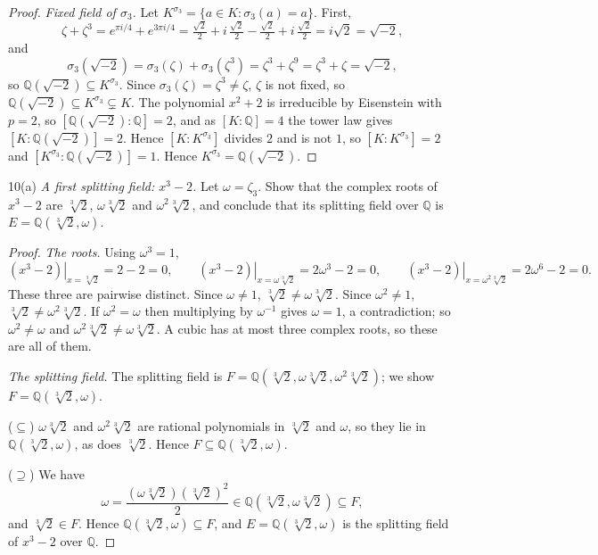 \documentclass[11pt]{article}
\begin{document}
\begin{proof}
\emph{Fixed field of $\sigma_3$.} Let
$K^{\sigma_3} = \{a \in K : \sigma_3(a) = a\}$. First,
\[
  \zeta + \zeta^3 = e^{\pi i/4} + e^{3\pi i/4}
  = \tfrac{\sqrt2}{2} + i\,\tfrac{\sqrt2}{2} - \tfrac{\sqrt2}{2} + i\,\tfrac{\sqrt2}{2}
  = i\sqrt2 = \sqrt{-2},
\]
and
\[
  \sigma_3(\sqrt{-2}) = \sigma_3(\zeta) + \sigma_3(\zeta^3)
  = \zeta^3 + \zeta^9 = \zeta^3 + \zeta = \sqrt{-2},
\]
so $\mathbb{Q}(\sqrt{-2}) \subseteq K^{\sigma_3}$. Since $\sigma_3(\zeta) = \zeta^3 \ne \zeta$,
$\zeta$ is not fixed, so
$\mathbb{Q}(\sqrt{-2}) \subseteq K^{\sigma_3} \subsetneq K$. The polynomial $x^2+2$ is
irreducible by Eisenstein with $p = 2$, so $[\mathbb{Q}(\sqrt{-2}):\mathbb{Q}] = 2$, and
as $[K:\mathbb{Q}] = 4$ the tower law gives $[K:\mathbb{Q}(\sqrt{-2})] = 2$. Hence
$[K:K^{\sigma_3}]$ divides $2$ and is not $1$, so $[K:K^{\sigma_3}] = 2$ and
$[K^{\sigma_3}:\mathbb{Q}(\sqrt{-2})] = 1$. Hence $K^{\sigma_3} = \mathbb{Q}(\sqrt{-2})$.
\end{proof}

\begin{problem}{10(a)}
  \emph{A first splitting field: $x^3 - 2$.} Let $\omega = \zeta_3$. Show that
  the complex roots of $x^3 - 2$ are $\sqrt[3]{2}$, $\omega\sqrt[3]{2}$ and
  $\omega^2\sqrt[3]{2}$, and conclude that its splitting field over
  $\mathbb{Q}$ is $E = \mathbb{Q}(\sqrt[3]{2}, \omega)$.
\end{problem}

\begin{proof}
\emph{The roots.} Using $\omega^3 = 1$,
\[
  \left.(x^3-2)\right|_{x=\sqrt[3]{2}} = 2 - 2 = 0, \qquad
  \left.(x^3-2)\right|_{x=\omega\sqrt[3]{2}} = 2\omega^3 - 2 = 0, \qquad
  \left.(x^3-2)\right|_{x=\omega^2\sqrt[3]{2}} = 2\omega^6 - 2 = 0.
\]
These three are pairwise distinct. Since $\omega \ne 1$,
$\sqrt[3]{2} \ne \omega\sqrt[3]{2}$. Since $\omega^2 \ne 1$,
$\sqrt[3]{2} \ne \omega^2\sqrt[3]{2}$. If $\omega^2 = \omega$ then multiplying by
$\omega^{-1}$ gives $\omega = 1$, a contradiction; so $\omega^2 \ne \omega$ and
$\omega^2\sqrt[3]{2} \ne \omega\sqrt[3]{2}$. A cubic has at most three complex
roots, so these are all of them.

\emph{The splitting field.} The splitting field is
$F = \mathbb{Q}(\sqrt[3]{2}, \omega\sqrt[3]{2}, \omega^2\sqrt[3]{2})$; we show
$F = \mathbb{Q}(\sqrt[3]{2}, \omega)$.

($\subseteq$) $\omega\sqrt[3]{2}$ and $\omega^2\sqrt[3]{2}$ are rational
polynomials in $\sqrt[3]{2}$ and $\omega$, so they lie in
$\mathbb{Q}(\sqrt[3]{2}, \omega)$, as does $\sqrt[3]{2}$. Hence
$F \subseteq \mathbb{Q}(\sqrt[3]{2}, \omega)$.

($\supseteq$) We have
\[
  \omega = \frac{(\omega\sqrt[3]{2})(\sqrt[3]{2})^2}{2}
  \in \mathbb{Q}(\sqrt[3]{2}, \omega\sqrt[3]{2}) \subseteq F,
\]
and $\sqrt[3]{2} \in F$. Hence $\mathbb{Q}(\sqrt[3]{2}, \omega) \subseteq F$, and
$E = \mathbb{Q}(\sqrt[3]{2}, \omega)$ is the splitting field of $x^3 - 2$ over
$\mathbb{Q}$.
\end{proof}
\end{document}
